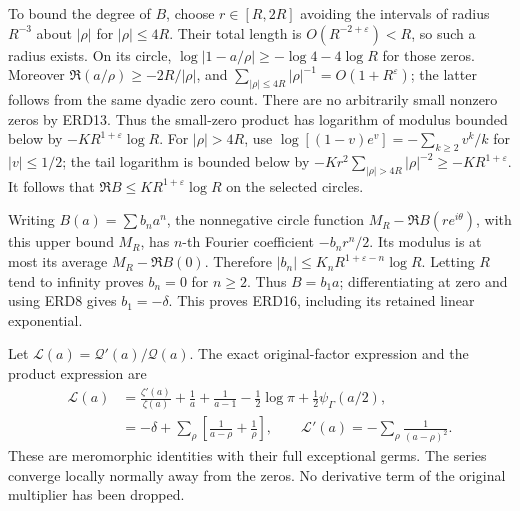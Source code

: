\documentclass[
  10pt,
  a4paper,
]{article}
\begin{document}
To bound the degree of \(B\), choose \(r\in[R,2R]\) avoiding the
intervals of radius \(R^{-3}\) about \(|\rho|\) for \(|\rho|\le4R\).
Their total length is \(O(R^{-2+\varepsilon})<R\), so such a radius
exists. On its circle, \(\log|1-a/\rho|\ge-\log4-4\log R\) for those
zeros. Moreover \(\Re(a/\rho)\ge-2R/|\rho|\), and
\(\sum_{|\rho|\le4R}|\rho|^{-1}=O(1+R^\varepsilon)\); the latter follows
from the same dyadic zero count. There are no arbitrarily small nonzero
zeros by ERD13. Thus the small-zero product has logarithm of modulus
bounded below by \(-K R^{1+\varepsilon}\log R\). For \(|\rho|>4R\), use
\(\log[(1-v)e^v]=-\sum_{k\ge2}v^k/k\) for \(|v|\le1/2\); the tail
logarithm is bounded below by
\(-K r^2\sum_{|\rho|>4R}|\rho|^{-2}\ge-K R^{1+\varepsilon}\). It follows
that \(\Re B\le K R^{1+\varepsilon}\log R\) on the selected circles.

Writing \(B(a)=\sum b_n a^n\), the nonnegative circle function
\(M_R-\Re B(r e^{i\theta})\), with this upper bound \(M_R\), has
\(n\)-th Fourier coefficient \(-b_n r^n/2\). Its modulus is at most its
average \(M_R-\Re B(0)\). Therefore
\(|b_n|\le K_nR^{1+\varepsilon-n}\log R\). Letting \(R\) tend to
infinity proves \(b_n=0\) for \(n\ge2\). Thus \(B=b_1a\);
differentiating at zero and using ERD8 gives \(b_1=-\delta\). This
proves ERD16, including its retained linear exponential.

Let \(\mathcal L(a)=\mathcal Q'(a)/\mathcal Q(a)\). The exact
original-factor expression and the product expression are \[
 \begin{aligned}
 \mathcal L(a)
 &=\frac{\zeta'(a)}{\zeta(a)}
    +\frac1a+\frac1{a-1}
    -\frac12\log\pi+\frac12\psi_\Gamma(a/2),\\
 &=-\delta+\sum_\rho
                  \left[\frac1{a-\rho}+\frac1\rho\right],
 \qquad
 \mathcal L'(a)=-\sum_\rho\frac1{(a-\rho)^2}.
 \end{aligned}
 \tag{ERD17}
\] These are meromorphic identities with their full exceptional germs.
The series converge locally normally away from the zeros. No derivative
term of the original multiplier has been dropped.
\end{document}
